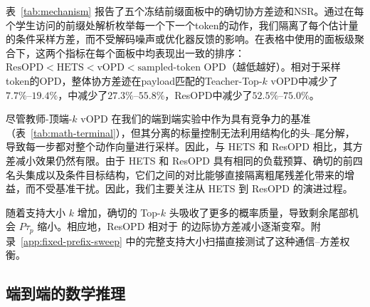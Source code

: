表~\ref{tab:mechanism} 报告了五个冻结前缀面板中的确切协方差迹和NSR。通过在每个学生访问的前缀处解析枚举每一个下一个token的动作，我们隔离了每个估计量的条件采样方差，而不受解码噪声或优化器反馈的影响。在表格中使用的面板级聚合下，这两个指标在每个面板中均表现出一致的排序：$\text{ResOPD} < \text{HETS} < \text{vOPD} < \text{sampled-token OPD}$（越低越好）。相对于采样token的OPD，整体协方差迹在payload匹配的Teacher-Top-$k$ vOPD中减少了$7.7\%\text{--}19.4\%$，\gzero{}中减少了$27.3\%\text{--}55.8\%$，ResOPD中减少了$52.5\%\text{--}75.0\%$。

尽管教师-顶端-$k$ vOPD 在我们的端到端实验中作为具有竞争力的基准（表~\ref{tab:math-terminal}），但其分离的标量控制无法利用结构化的头--尾分解，导致每一步都对整个动作向量进行采样。因此，与 HETS 和 ResOPD 相比，其方差减小效果仍然有限。由于 HETS 和 ResOPD 具有相同的负载预算、确切的前四名头集成以及条件目标结构，它们之间的对比能够直接隔离粗尾残差化带来的增益，而不受基准干扰。因此，我们主要关注从 HETS 到 ResOPD 的演进过程。

随着支持大小 $k$ 增加，确切的 Top-$k$ 头吸收了更多的概率质量，导致剩余尾部机会 $P\tau_p$ 缩小。相应地，ResOPD 相对于 \gzero{} 的边际协方差减小逐渐变窄。附录~\ref{app:fixed-prefix-sweep} 中的完整支持大小扫描直接测试了这种通信--方差权衡。

\subsection{端到端的数学推理}
\label{sec:math-opd}

